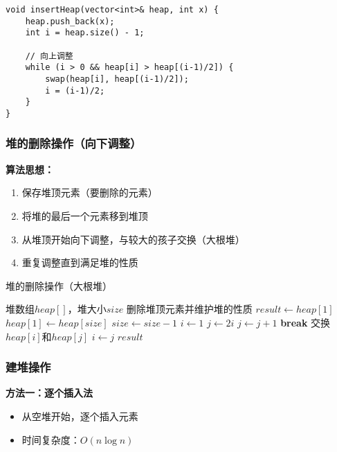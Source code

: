 \documentclass[12pt,a4paper]{amsart}
\begin{document}
\begin{lstlisting}[caption=堆插入操作的C++实现]
void insertHeap(vector<int>& heap, int x) {
    heap.push_back(x);
    int i = heap.size() - 1;
    
    // 向上调整
    while (i > 0 && heap[i] > heap[(i-1)/2]) {
        swap(heap[i], heap[(i-1)/2]);
        i = (i-1)/2;
    }
}
\end{lstlisting}

\subsubsection{堆的删除操作（向下调整）}

\textbf{算法思想：}
\begin{enumerate}
\item 保存堆顶元素（要删除的元素）
\item 将堆的最后一个元素移到堆顶
\item 从堆顶开始向下调整，与较大的孩子交换（大根堆）
\item 重复调整直到满足堆的性质
\end{enumerate}

\begin{algorithm}[H]
\caption{堆的删除操作（大根堆）}
\begin{algorithmic}[1]
\REQUIRE 堆数组$heap[]$，堆大小$size$
\ENSURE 删除堆顶元素并维护堆的性质
\STATE $result \leftarrow heap[1]$
\STATE $heap[1] \leftarrow heap[size]$
\STATE $size \leftarrow size - 1$
\STATE $i \leftarrow 1$
    \STATE $j \leftarrow 2i$ 
        \STATE $j \leftarrow j+1$ 
    \ENDIF
        \STATE \textbf{break} 
    \ELSE
        \STATE 交换$heap[i]$和$heap[j]$
        \STATE $i \leftarrow j$
    \ENDIF
\ENDWHILE
\RETURN $result$
\end{algorithmic}
\end{algorithm}

\subsubsection{建堆操作}

\textbf{方法一：逐个插入法}
\begin{itemize}
\item 从空堆开始，逐个插入元素
\item 时间复杂度：$O(n \log n)$
\end{itemize}
\end{document}
